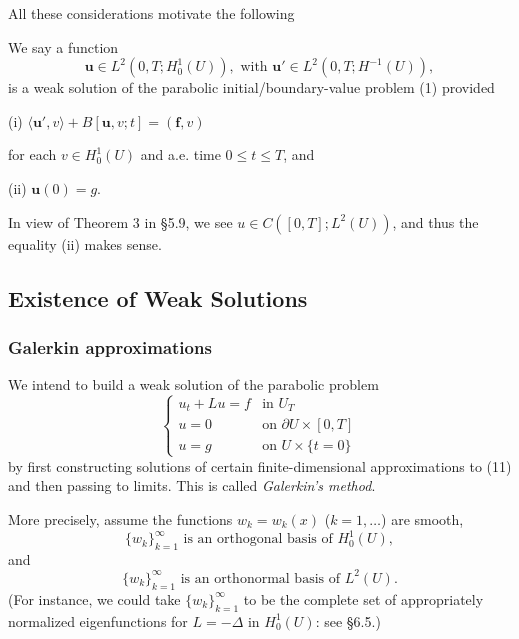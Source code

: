 All these considerations motivate the following

\begin{definition}
\label{def:weak-solution-parabolic-bvp}
We say a function
\[
\mathbf{u} \in L^2(0,T; H_0^1(U)), \text{ with } \mathbf{u}' \in L^2(0,T; H^{-1}(U)),
\]
is a weak solution of the parabolic initial/boundary-value problem (1) provided

\quad (i) $\langle \mathbf{u}', v \rangle + B[\mathbf{u},v;t] = (\mathbf{f},v)$

for each $v \in H_0^1(U)$ and a.e. time $0 \le t \le T$, and

\quad (ii) $\mathbf{u}(0) = g$.
\end{definition}

\begin{remark}
\label{rem:weak-solution-parabolic-continuity}
In view of Theorem 3 in \S5.9, we see $u \in C([0,T]; L^2(U))$, and thus the equality (ii) makes sense.
\end{remark}

\subsection{Existence of Weak Solutions}

\subsubsection{Galerkin approximations}

We intend to build a weak solution of the parabolic problem
\[
\begin{cases}
u_t + Lu = f & \text{in } U_T \\
u = 0 & \text{on } \partial U \times [0,T] \\
u = g & \text{on } U \times \{t = 0\}
\end{cases} \tag{11}
\]
by first constructing solutions of certain finite-dimensional approximations to (11) and then passing to limits. This is called \textit{Galerkin's method}.

More precisely, assume the functions $w_k = w_k(x)$ ($k = 1, \ldots$) are smooth,
\[
\{w_k\}_{k=1}^{\infty} \text{ is an orthogonal basis of } H_0^1(U), \tag{12}
\]
and
\[
\{w_k\}_{k=1}^{\infty} \text{ is an orthonormal basis of } L^2(U). \tag{13}
\]
(For instance, we could take $\{w_k\}_{k=1}^{\infty}$ to be the complete set of appropriately normalized eigenfunctions for $L = -\Delta$ in $H_0^1(U)$: see \S6.5.)

